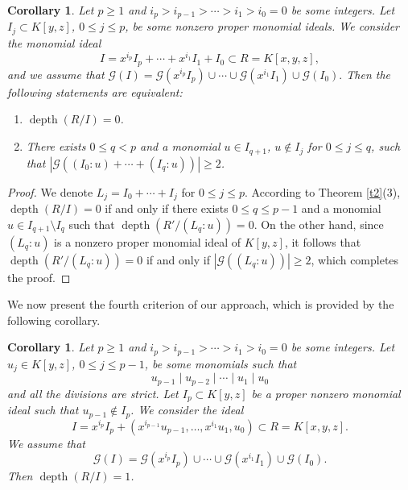\documentclass[11pt]{amsart}
\newtheorem{corollary}[theorem]{Corollary}
\def\depth{\operatorname{depth}}
\begin{document}


\begin{corollary}\label{c2}
Let $p\geq 1$ and $i_p>i_{p-1}>\cdots>i_1>i_0=0$ be some integers. Let $I_j\subset K[y,z]$, $0\leq j\leq p$, be some nonzero 
proper monomial ideals. We consider the monomial ideal $$I=x^{i_p}I_p + \cdots + x^{i_1}I_1 + I_0 \subset R=K[x,y,z],$$
 and we assume that
$\mathcal{G}(I)=\mathcal{G}(x^{i_p}I_p) \cup \cdots \cup \mathcal{G}(x^{i_1}I_1) \cup \mathcal{G}(I_0).$ 
Then the following statements are  equivalent:
\begin{enumerate}
\item[(1)] $\depth(R/I)=0$.
\item[(2)] There exists $0\leq q<p$ and a monomial $u\in I_{q+1}$, $u\notin I_j$  for $0\leq j\leq q$, 
           such that $|\mathcal{G}((I_0:u)+\cdots+(I_q:u))|\geq 2$.
\end{enumerate}
\end{corollary}

\begin{proof}
We denote $L_j=I_0+\cdots+I_j$  for $0\leq j\leq p$. According to Theorem \ref{t2}(3), $\depth(R/I)=0$ if and only if 
there exists $0\leq q\leq p-1$ and a monomial $u\in I_{q+1}\setminus I_q$ such that $\depth(R'/(L_q:u))=0$. On the other hand, since $(L_q:u)$
is a nonzero proper monomial ideal of $K[y,z]$, it follows that $\depth(R'/(L_q:u))=0$ if and only if $|\mathcal{G}((L_q:u))|\geq 2$,
which completes the proof.  
\end{proof}


We now present the fourth  criterion of our approach, which is provided by the following corollary.


\begin{corollary}\label{c3}
Let $p\geq 1$ and $i_p>i_{p-1}>\cdots>i_1>i_0=0$ be some integers.
Let $u_j\in K[y,z]$, $0\leq j\leq p-1$, be some monomials such that
\[
u_{p-1}\mid u_{p-2}\mid\cdots\mid u_1\mid u_0
\]
and all the divisions are strict. Let $I_p\subset K[y,z]$ be a proper
nonzero monomial ideal such that $u_{p-1}\notin I_p$. We consider the ideal
\[
I=x^{i_p}I_p+(x^{i_{p-1}}u_{p-1},\ldots,x^{i_1}u_1,u_0)
\subset R=K[x,y,z].
\]
We assume that \[
\mathcal{G}(I)
=
\mathcal{G}(x^{i_p}I_p)\cup\cdots\cup
\mathcal{G}(x^{i_1}I_1)\cup\mathcal{G}(I_0).
\]
Then $\depth(R/I)=1$.
\end{corollary}
\end{document}
